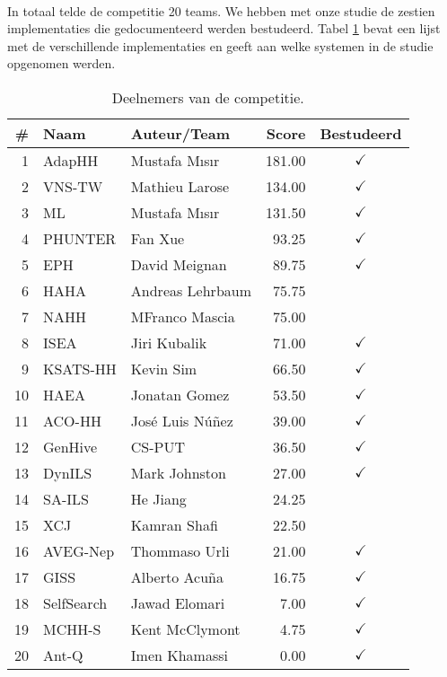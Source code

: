 \paragraph{}
In totaal telde de competitie 20 teams. We hebben met onze studie de zestien implementaties die gedocumenteerd werden bestudeerd. Tabel \ref{tbl:chescParticipants} bevat een lijst met de verschillende implementaties en geeft aan welke systemen in de studie opgenomen werden.

\begin{table}[hbt]
  \centering
  \begin{tabular}{rllrc} \toprule
    \#&Naam&Auteur/Team&Score&Bestudeerd\\\midrule
    1&	AdapHH\cite{chesc-adaphh,chesc-adaphh2}&		Mustafa M\i{}s\i{}r&	181.00&	$\checkmark$\\
    2&	VNS-TW\cite{chesc-vns-tw}&				Mathieu Larose&		134.00&	$\checkmark$\\
    3&	ML\cite{chesc-ml,chesc-ml2}&				Mustafa M\i{}s\i{}r&	131.50&	$\checkmark$\\
    4&	PHUNTER\cite{chesc-phunter}&				Fan Xue&		93.25&	$\checkmark$\\
    5&	EPH\cite{chesc-eph}&					David Meignan&		89.75&	$\checkmark$\\
    6&	HAHA&							Andreas Lehrbaum&	75.75&	\\
    7&	NAHH&							MFranco Mascia&		75.00&	\\
    8&	ISEA\cite{chesc-isea}&					Jiri Kubalik&		71.00&	$\checkmark$\\
    9&	KSATS-HH\cite{chesc-ksats-hh}&				Kevin Sim&		66.50&	$\checkmark$\\
    10&	HAEA\cite{chesc-haea}&					Jonatan Gomez&		53.50&	$\checkmark$\\
    11&	ACO-HH\cite{chesc-aco-hh}&				Jos\'e Luis N\'u\~nez&	39.00&	$\checkmark$\\
    12&	GenHive\cite{chesc-genhive}&				CS-PUT&			36.50&	$\checkmark$\\
    13&	DynILS\cite{chesc-dynils}&				Mark Johnston&		27.00&	$\checkmark$\\
    14&	SA-ILS&							He Jiang&		24.25&	\\
    15&	XCJ&							Kamran Shafi&		22.50&	\\
    16&	AVEG-Nep\cite{chesc-aveg-nep}&				Thommaso Urli&		21.00&	$\checkmark$\\
    17&	GISS\cite{chesc-giss}&					Alberto Acu\~na&	16.75&	$\checkmark$\\
    18&	SelfSearch\cite{chesc-selfsearch}&			Jawad Elomari&		7.00&	$\checkmark$\\
    19&	MCHH-S\cite{chesc-mchh-s}&				Kent McClymont&		4.75&	$\checkmark$\\
    20&	Ant-Q\cite{chesc-ant-q}&				Imen Khamassi&		0.00&	$\checkmark$\\
    \bottomrule
  \end{tabular}
  \caption{Deelnemers van de \abchescy{} competitie.}
  \label{tbl:chescParticipants}
\end{table}


